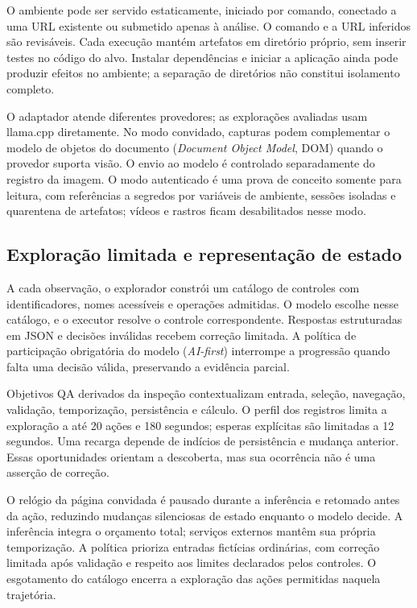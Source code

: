 \documentclass[12pt]{article}
\begin{document}
O ambiente pode ser servido estaticamente, iniciado por comando, conectado a uma URL existente ou submetido apenas à análise. O comando e a URL inferidos são revisáveis. Cada execução mantém artefatos em diretório próprio, sem inserir testes no código do alvo. Instalar dependências e iniciar a aplicação ainda pode produzir efeitos no ambiente; a separação de diretórios não constitui isolamento completo.

O adaptador atende diferentes provedores; as explorações avaliadas usam llama.cpp diretamente. No modo convidado, capturas podem complementar o modelo de objetos do documento (\textit{Document Object Model}, DOM) quando o provedor suporta visão. O envio ao modelo é controlado separadamente do registro da imagem. O modo autenticado é uma prova de conceito somente para leitura, com referências a segredos por variáveis de ambiente, sessões isoladas e quarentena de artefatos; vídeos e rastros ficam desabilitados nesse modo.

\subsection{Exploração limitada e representação de estado}
A cada observação, o explorador constrói um catálogo de controles com identificadores, nomes acessíveis e operações admitidas. O modelo escolhe nesse catálogo, e o executor resolve o controle correspondente. Respostas estruturadas em JSON e decisões inválidas recebem correção limitada. A política de participação obrigatória do modelo (\textit{AI-first}) interrompe a progressão quando falta uma decisão válida, preservando a evidência parcial.

Objetivos QA derivados da inspeção contextualizam entrada, seleção, navegação, validação, temporização, persistência e cálculo. O perfil dos registros limita a exploração a até 20 ações e 180 segundos; esperas explícitas são limitadas a 12 segundos. Uma recarga depende de indícios de persistência e mudança anterior. Essas oportunidades orientam a descoberta, mas sua ocorrência não é uma asserção de correção.

O relógio da página convidada é pausado durante a inferência e retomado antes da ação, reduzindo mudanças silenciosas de estado enquanto o modelo decide. A inferência integra o orçamento total; serviços externos mantêm sua própria temporização. A política prioriza entradas fictícias ordinárias, com correção limitada após validação e respeito aos limites declarados pelos controles. O esgotamento do catálogo encerra a exploração das ações permitidas naquela trajetória.
\end{document}
